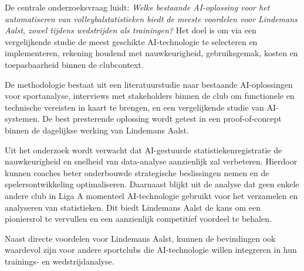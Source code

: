 De centrale onderzoeksvraag luidt: \textit{Welke bestaande AI-oplossing voor het automatiseren van volleybalstatistieken biedt de meeste voordelen voor Lindemans Aalst, zowel tijdens wedstrijden als trainingen?} Het doel is om via een vergelijkende studie de meest geschikte AI-technologie te selecteren en implementeren, rekening houdend met nauwkeurigheid, gebruiksgemak, kosten en toepasbaarheid binnen de clubcontext.

De methodologie bestaat uit een literatuurstudie naar bestaande AI-oplossingen voor sportanalyse, interviews met stakeholders binnen de club om functionele en technische vereisten in kaart te brengen, en een vergelijkende studie van AI-systemen. De best presterende oplossing wordt getest in een proof-of-concept binnen de dagelijkse werking van Lindemans Aalst.

Uit het onderzoek wordt verwacht dat AI-gestuurde statistiekenregistratie de nauwkeurigheid en snelheid van data-analyse aanzienlijk zal verbeteren. Hierdoor kunnen coaches beter onderbouwde strategische beslissingen nemen en de spelersontwikkeling optimaliseren. Daarnaast blijkt uit de analyse dat geen enkele andere club in Liga A momenteel AI-technologie gebruikt voor het verzamelen en analyseren van statistieken. Dit biedt Lindemans Aalst de kans om een pioniersrol te vervullen en een aanzienlijk competitief voordeel te behalen.

Naast directe voordelen voor Lindemans Aalst, kunnen de bevindingen ook waardevol zijn voor andere sportclubs die AI-technologie willen integreren in hun trainings- en wedstrijdanalyse.

